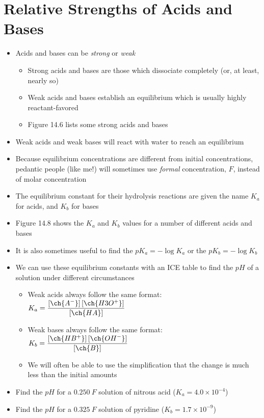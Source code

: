 \documentclass[12pt, openany, letterpaper]{memoir}
\begin{document}
\section{Relative Strengths of Acids and Bases}
\begin{itemize}
	\item Acids and bases can be \emph{strong} or \emph{weak}
	\begin{itemize}
		\item Strong acids and bases are those which dissociate completely (or, at least, nearly so) 
		\item Weak acids and bases establish an equilibrium which is usually highly reactant-favored
    \item Figure 14.6 lists some strong acids and bases
	\end{itemize}
  \item Weak acids and weak bases will react with water to reach an equilibrium
	\item Because equilibrium concentrations are different from initial concentrations, pedantic people (like me!) will sometimes use \emph{formal} concentration, $F$, instead of molar concentration
	\item The equilibrium constant for their hydrolysis reactions are given the name $K_a$ for acids, and $K_b$ for bases
	\item Figure 14.8 shows the $K_a$ and $K_b$ values for a number of different acids and bases
	\item It is also sometimes useful to find the $pK_a = -\log K_a$ or the $pK_b=-\log K_b$
	\item We can use these equilibrium constants with an ICE table to find the $pH$ of a solution under different circumstances
	\begin{itemize}
		\item Weak acids always follow the same format: $K_a=\dfrac{\left[\ch{A^-}\right]\left[\ch{H3O^+}\right]}{\left[\ch{HA}\right]}$
		\item Weak bases always follow the same format: $K_b=\dfrac{\left[\ch{HB^+}\right]\left[\ch{OH^-}\right]}{\left[\ch{B}\right]}$
		\item We will often be able to use the simplification that the change is much less than the initial amounts
	\end{itemize}
	\item Find the $pH$ for a $0.250~F$ solution of nitrous acid ($K_a=4.0\times10^{-4}$)
	\item Find the $pH$ for a $0.325~F$ solution of pyridine ($K_b=1.7\times10^{-9}$)

\end{itemize}
\end{document}
